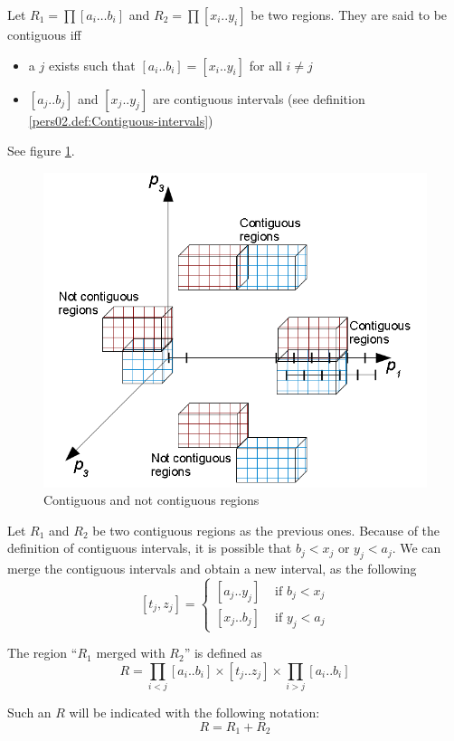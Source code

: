 \begin{definition}Let $R_{1}=\prod\left[a_{i}\dots b_{i}\right]$ and $R_{2}=\prod\left[x_{i}..y_{i}\right]$
be two regions. They are said to be contiguous iff
\begin{itemize}
\item a $j$ exists such that $\left[a_{i}..b_{i}\right]=\left[x_{i}..y_{i}\right]$
for all $i\neq j$ 
\item $\left[a_{j}..b_{j}\right]$ and $\left[x_{j}..y_{j}\right]$ are
contiguous intervals (see definition \ref{pers02.def:Contiguous-intervals})
\end{itemize}
\end{definition}
See figure \ref{pers02.fig:Contiguous-regions}.

\begin{figure}[h]
\includegraphics[width=0.5\columnwidth]{img/contiguous_regions}

\caption{\label{pers02.fig:Contiguous-regions}Contiguous and not contiguous
regions}
\end{figure}



\begin{definition}
\label{pers02.def:Merging-regions}
Let $R_{1}$ and $R_{2}$ be two contiguous regions as the previous
ones. Because of the definition of contiguous intervals, it is possible
that $b_{j}<x_{j}$ or $y_{j}<a_{j}$. We can merge the contiguous
intervals and obtain a new interval, as the following
\[
\left[t_{j},z_{j}\right]=\begin{cases}
\left[a_{j}..y_{j}\right] & \mbox{ if }b_{j}<x_{j}\\
\left[x_{j}..b_{j}\right] & \mbox{ if }y_{j}<a_{j}
\end{cases}
\]


The region ``$R_{1}$ merged with $R_{2}$'' is defined as
\[
R=\prod_{i<j}\left[a_{i}..b_{i}\right]\times\left[t_{j}..z_{j}\right]\times\prod_{i>j}\left[a_{i}..b_{i}\right]
\]


Such an $R$ will be indicated with the following notation:
\[
R=R_{1}+R_{2}
\]
\end{definition}

